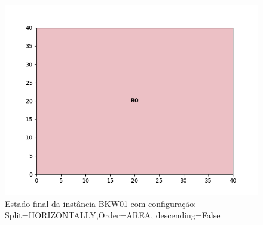 \begin{figure}[H]
    \centering
    \caption[]{Estado final da instância BKW01 com configuração: Split=HORIZONTALLY,Order=AREA, descending=False}
    \label{fig:bkw01-horizontally-area-false}
    \includegraphics[scale=0.5]{output/figures/bkw/bkw01/horizontally/area/false/00}
\end{figure}